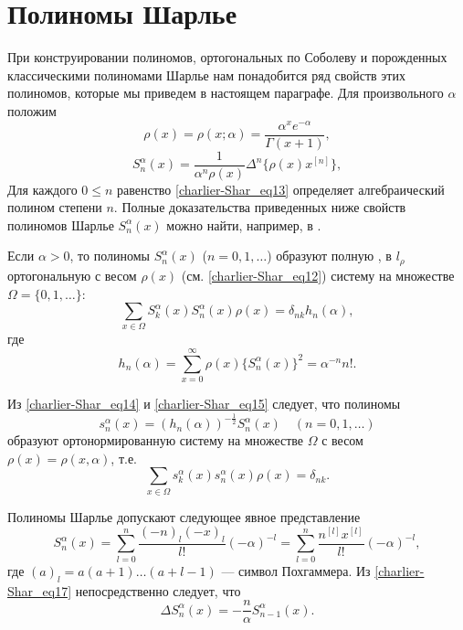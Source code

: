 \section{Полиномы Шарлье}

При конструировании полиномов, ортогональных по Соболеву и порожденных классическими полиномами Шарлье нам понадобится ряд свойств этих полиномов, которые мы приведем в настоящем параграфе.
Для произвольного $\alpha$ положим
\begin{equation}\label{charlier-Shar_eq12}
\rho(x)=\rho(x;\alpha)=\frac{\alpha^x e^{-\alpha}}{\Gamma(x+1)},
\end{equation}
\begin{equation}\label{charlier-Shar_eq13}
S_n^{\alpha}(x)=\frac{1}{\alpha^n \rho(x)} \Delta^n \{\rho(x)x^{[n]}\},
\end{equation}
Для каждого $0\le n$ равенство \eqref{charlier-Shar_eq13} определяет \cite{ramis-Ram1, charlier-Shar10} алгебраический полином степени $n$.
Полные доказательства приведенных ниже свойств полиномов Шарлье $S_n^{\alpha}(x)$
можно найти, например, в \cite{ramis-Ram1}.

Если $\alpha>0$, то полиномы $S_n^{\alpha}(x)$ ($n=0,1,\ldots$) образуют полную \cite{ramis-Ram1}, \cite{charlier-Shar11} в $l_\rho$ ортогональную с весом $\rho(x)$ (см. \eqref{charlier-Shar_eq12}) систему на множестве $\Omega=\{0,1,\ldots\}$:
\begin{equation}\label{charlier-Shar_eq14}
\sum_{x\in\Omega}S_k^\alpha(x)S_n^\alpha(x)\rho(x)=\delta_{nk} h_n(\alpha),
\end{equation}
где
\begin{equation}\label{charlier-Shar_eq15}
h_n(\alpha) = \sum_{x=0}^{\infty} \rho(x) \{S_n^\alpha(x)\}^2 = \alpha^{-n} n! .
\end{equation}

Из \eqref{charlier-Shar_eq14} и \eqref{charlier-Shar_eq15} следует, что полиномы
\begin{equation}\label{charlier-Shar_eq16}
s_n^\alpha(x)=(h_n(\alpha))^{-\frac12} S_n^\alpha(x) \quad (n=0,1,\ldots)
\end{equation}
образуют ортонормированную систему на множестве $\Omega$ с весом $\rho(x)=\rho(x,\alpha)$, т.е.
\begin{equation*}
\sum_{x\in\Omega} s_k^\alpha(x) s_n^\alpha(x)\rho(x)=\delta_{nk}.
\end{equation*}

Полиномы Шарлье допускают следующее явное представление
\begin{equation} \label{charlier-Shar_eq17}
S_n^\alpha(x) = \sum_{l=0}^n \frac{(-n)_l(-x)_l}{l!} (-\alpha)^{-l} = \sum_{l=0}^n \frac{n^{[l]}x^{[l]}}{l!} (-\alpha)^{-l},
\end{equation}
где $(a)_l=a(a+1)\ldots(a+l-1)$ --- символ Похгаммера. Из \eqref{charlier-Shar_eq17} непосредственно следует, что
\begin{equation}\label{charlier-Shar_eq18}
\Delta S_n^{\alpha}(x) = -\frac{n}{\alpha} S_{n-1}^{\alpha}(x).
\end{equation}